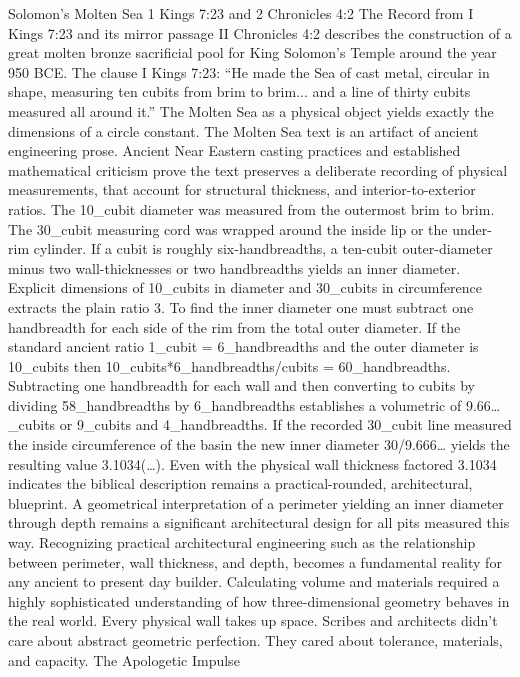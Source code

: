 Solomon’s Molten Sea
1 Kings 7:23 and 2 Chronicles 4:2
The Record from I Kings 7:23 and its mirror passage II Chronicles 4:2 describes the construction of a great molten bronze sacrificial pool for King Solomon’s Temple around the year 950 BCE. The clause I Kings 7:23: 
“He made the Sea of cast metal, circular in shape, measuring ten cubits from brim to brim... and a line of thirty cubits measured all around it.”
The Molten Sea as a physical object yields exactly the dimensions of a circle constant. The Molten Sea text is an artifact of ancient engineering prose. Ancient Near Eastern casting practices and established mathematical criticism prove the text preserves a deliberate recording of physical measurements, that account for structural thickness, and interior-to-exterior ratios. The 10_cubit diameter was measured from the outermost brim to brim. The 30_cubit measuring cord was wrapped around the inside lip or the under-rim cylinder. If a cubit is roughly six-handbreadths, a ten-cubit outer-diameter minus two wall-thicknesses or two handbreadths yields an inner diameter. Explicit dimensions of 10_cubits in diameter and 30_cubits in circumference extracts the plain ratio 3. 
To find the inner diameter one must subtract one handbreadth for each side of the rim from the total outer diameter. If the standard ancient ratio 1_cubit = 6_handbreadths and the outer diameter is 10_cubits then 10_cubits*6_handbreadths/cubits = 60_handbreadths. Subtracting one handbreadth for each wall and then converting to cubits by dividing 58_handbreadths by 6_handbreadths establishes a volumetric of 9.66…_cubits or 9_cubits and 4_handbreadths. If the recorded 30_cubit line measured the inside circumference of the basin the new inner diameter 30/9.666… yields the resulting value 3.1034(…). 
Even with the physical wall thickness factored 3.1034 indicates the biblical description remains a practical-rounded, architectural, blueprint. A geometrical interpretation of a perimeter yielding an inner diameter through depth remains a significant architectural design for all pits measured this way. Recognizing practical architectural engineering such as the relationship between perimeter, wall thickness, and depth, becomes a fundamental reality for any ancient to present day builder. Calculating volume and materials required a highly sophisticated understanding of how three-dimensional geometry behaves in the real world. Every physical wall takes up space. Scribes and architects didn’t care about abstract geometric perfection. They cared about tolerance, materials, and capacity. 
The Apologetic Impulse
